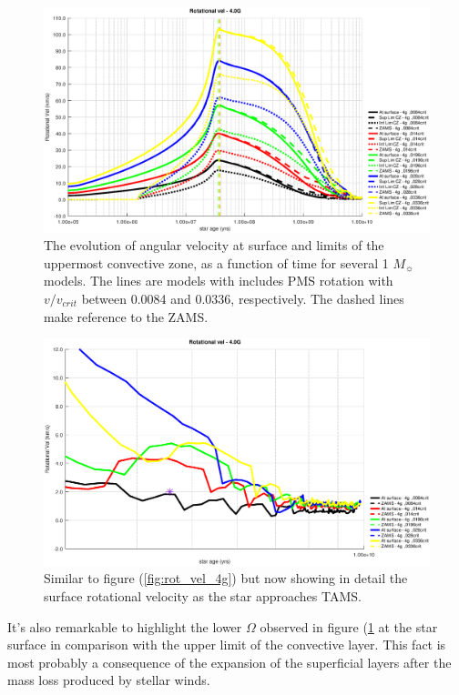 \documentclass[fleqn,usenatbib]{mnras}
\begin{document}
\begin{figure}
	\includegraphics[width=\columnwidth]{figures/rot_vel_cz_4g.eps}
    \caption{The evolution of angular velocity at surface and limits of the uppermost convective zone, as a function of time for several 1 $M_{\sun}$ models. The lines are models with includes PMS rotation with $v/v_{crit}$ between 0.0084 and 0.0336, respectively. The dashed lines make reference to the ZAMS.}
    \label{fig:rot_vel_cz_4g}
\end{figure}

\begin{figure}
	\includegraphics[width=\columnwidth]{figures/rot_vel_4g_z1.eps}
    \caption{Similar to figure (\ref{fig:rot_vel_4g}) but now showing in detail the surface rotational velocity as the star approaches TAMS.}
    \label{fig:rot_vel_4g_z1}
\end{figure}

It's also remarkable to highlight the lower $\Omega$ observed in figure (\ref{fig:rot_vel_cz_4g} at the star surface in comparison with the upper limit of the convective layer. This fact is most probably a consequence of the expansion of the superficial layers after the mass loss produced by stellar winds.\par
\end{document}
